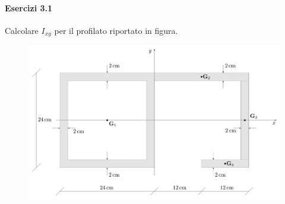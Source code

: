 \paragraph{Esercizi 3.1}
Calcolare $I_{xy}$ per il profilato riportato in figura.
\renewcommand{\thefigure}{3.1~-~1}
\begin{figure}[ht]
\centering
\includegraphics[width=\textwidth]{Immagini/Parte_3/Esercizio3_1/Esercizio3_1_1.pdf}
\caption{}
\label{Esercizio3_1}
\end{figure}

